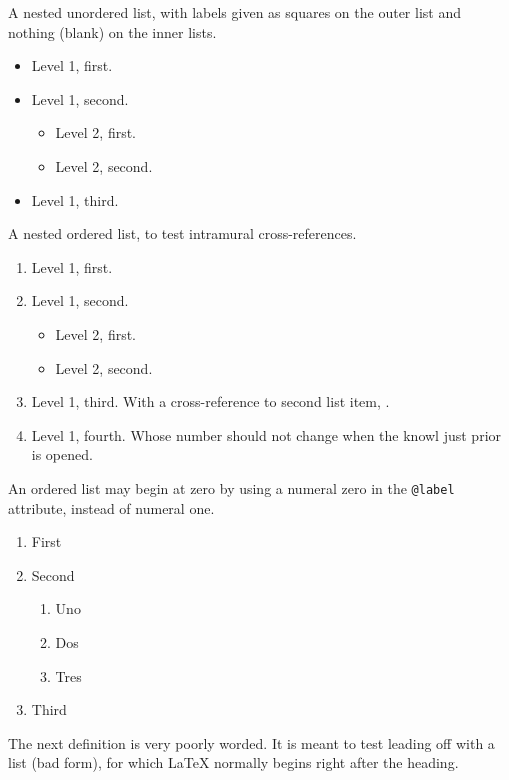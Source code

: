 \documentclass[pdflatex]{sn-jnl}
\theoremstyle{thmstyleone}%
\theoremstyle{thmstyletwo}%
\theoremstyle{thmstylethree}%
\newcommand{\xreffont}{\relax}
\newcommand{\mono}[1]{\texttt{#1}}
\numberwithin{equation}{section}
\begin{document}
%
\par
A nested unordered list, with labels given as squares on the outer list and nothing (blank) on the inner lists.%
\begin{itemize}[label=$\blacksquare$]
\item{}Level 1, first.%
\item{}Level 1, second.%
\begin{itemize}[label=]
\item{}Level 2, first.%
\item{}Level 2, second.%
\end{itemize}
%
\item{}Level 1, third.%
\end{itemize}
%
\par
A nested ordered list, to test intramural cross-references.%
\begin{enumerate}
\item{}Level 1, first.%
\item\hypertarget{list-item-second}{}Level 1, second.%
\begin{itemize}[label=]
\item{}Level 2, first.%
\item{}Level 2, second.%
\end{itemize}
%
\item{}Level 1, third.  With a cross-reference to second list item, \hyperlink{list-item-second}{{\xreffont 2}}.%
\item{}Level 1, fourth.  Whose number should not change when the knowl just prior is opened.%
\end{enumerate}
%
\par
An ordered list may begin at zero by using a numeral zero in the \mono{@label} attribute, instead of numeral one.%
\begin{enumerate}[label={(\arabic*), start=0}]
\item{}First%
\item{}Second%
\begin{enumerate}[label={-\arabic*-, start=0}]
\item{}Uno%
\item{}Dos%
\item{}Tres%
\end{enumerate}
%
\item{}Third%
\end{enumerate}
%
\par
The next definition is very poorly worded.  It is meant to test leading off with a list (bad form), for which \LaTeX{} normally begins right after the heading.%
\end{document}
